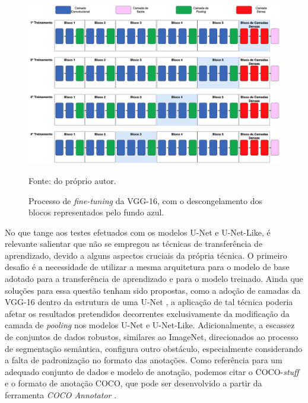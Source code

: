 \begin{figure}[H]
    \centering
    \caption{Processo de \textit{fine-tuning} da VGG-16, com o descongelamento dos blocos representados pelo fundo azul.}
    \includegraphics[width=1\textwidth]{recursos/imagens/project/fine-tunning.png}
    \label{project:fig:transf1}

    Fonte: do próprio autor.
\end{figure}

No que tange aos testes efetuados com os modelos U-Net e U-Net-Like, é relevante salientar que não se empregou as técnicas de transferência de aprendizado, devido a alguns aspectos cruciais da própria técnica. O primeiro desafio é a necessidade de utilizar a mesma arquitetura para o modelo de base adotado para a transferência de aprendizado e para o modelo treinado. Ainda que soluções para essa questão tenham sido propostas, como a adoção de camadas da VGG-16 dentro da estrutura de uma U-Net \citep{Pravitasari2020UNet-VGG16Segmentation}, a aplicação de tal técnica poderia afetar os resultados pretendidos decorrentes exclusivamente da modificação da camada de \textit{pooling} nos modelos U-Net e U-Net-Like. Adicionalmente, a escassez de conjuntos de dados robustos, similares ao ImageNet, direcionados ao processo de segmentação semântica, configura outro obstáculo, especialmente considerando a falta de padronização no formato das anotações. Como referência para um adequado conjunto de dados e modelo de anotação, podemos citar o COCO-\textit{stuff} \citep{Caesar2016} e o formato de anotação COCO, que pode ser desenvolvido a partir da ferramenta \textit{COCO Annotator} \citep{Brooks2019COCOAnnotator}.


